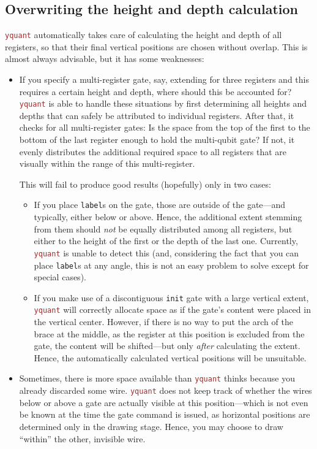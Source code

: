 \documentclass{scrartcl}
\def\pkg#1{\textcolor{brown}{\texttt{#1}}}
\def\ttlink{\link\texttt}
\def\Yquant{\pkg{yquant}}
\begin{document}
      \subsection{Overwriting the height and depth calculation}
         \Yquant{} automatically takes care of calculating the height and depth of all registers, so that their final vertical positions are chosen without overlap.
         This is almost always advisable, but it has some weaknesses:
         \begin{itemize}
            \item If you specify a multi\hyp register gate, say, extending for three registers and this requires a certain height and depth, where should this be accounted for?
               \Yquant{} is able to handle these situations by first determining all heights and depths that can safely be attributed to individual registers.
               After that, it checks for all multi\hyp register gates: Is the space from the top of the first to the bottom of the last register enough to hold the multi\hyp qubit gate?
               If not, it evenly distributes the additional required space to all registers that are visually within the range of this multi\hyp register.

               This will fail to produce good results (hopefully) only in two cases:
               \begin{itemize}
                  \item If you place \texttt{label}s on the gate, those are outside of the gate---and typically, either below or above.
                     Hence, the additional extent stemming from them should \emph{not} be equally distributed among all registers, but either to the height of the first or the depth of the last one.
                     Currently, \Yquant{} is unable to detect this (and, considering the fact that you can place \texttt{label}s at any angle, this is not an easy problem to solve except for special cases).
                  \item If you make use of a discontiguous \ttlink{init} gate with a large vertical extent, \Yquant{} will correctly allocate space as if the gate's content were placed in the vertical center.
                     However, if there is no way to put the arch of the brace at the middle, as the register at this position is excluded from the gate, the content will be shifted---but only \emph{after} calculating the extent.
                     Hence, the automatically calculated vertical positions will be unsuitable.
               \end{itemize}
            \item Sometimes, there is more space available than \Yquant{} thinks because you already discarded some wire.
               \Yquant{} does not keep track of whether the wires below or above a gate are actually visible at this position---which is not even be known at the time the gate command is issued, as horizontal positions are determined only in the drawing stage.
               Hence, you may choose to draw ``within'' the other, invisible wire.
         \end{itemize}
\end{document}
